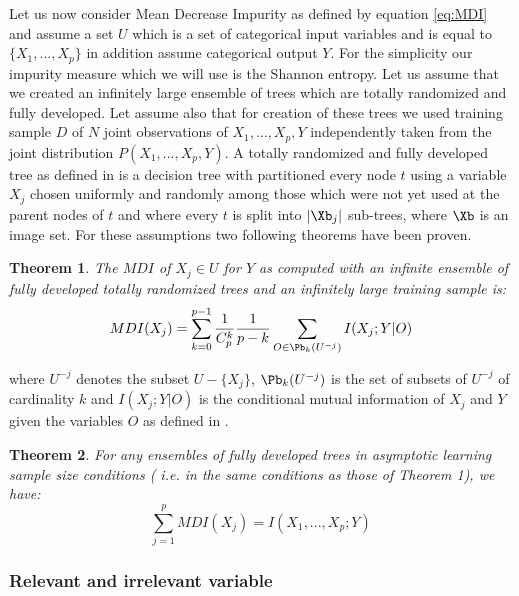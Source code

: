 Let us now consider Mean Decrease Impurity as defined by equation \eqref{eq:MDI} and assume a set $U$ which is a set of categorical input variables and is equal to $\{X_1,...,X_p\}$ in addition assume categorical output $Y$. For the simplicity our impurity measure which we will use is the Shannon entropy. Let us assume that we created an infinitely large ensemble of trees which are totally randomized and fully developed. Let assume also that for creation of these trees we used training sample $D$ of $N$ joint observations of $X_1,...,X_p,Y$ independently taken from the joint distribution $P(X_1,...,X_p,Y)$. A totally randomized and fully developed tree as defined in \cite{louppe2013understanding} is a decision tree with partitioned every node $t$ using a variable $X_j$ chosen uniformly and randomly among those which were not yet used at the parent nodes of $t$
and where every $t$ is split into $|\Xb_j|$ sub-trees, where $\Xb$ is an image set. For these assumptions two following theorems have been proven.

\newtheorem{theorem}{Theorem}
\begin{theorem}
    The $MDI$ of $X_j \in U$ for $Y$ as computed with an infinite ensemble of fully developed totally randomized trees and an infinitely large training sample is:
    \begin{equation}
	{MDI}( X_{j} ) = \displaystyle \sum_{k=0}^{p-1}\frac{1}{C^k_p}\frac{1}{p-k} \displaystyle\sum_{O \in \Pb_{k}(U^{-j})} I(X_j;Y|O)
    \end{equation}
    
\end{theorem}
where $U^{-j}$ denotes the subset $U-\{X_j\}$, $\Pb_{k}(U^{-j})$ is the set of subsets of $U^{-j}$
of cardinality $k$ and $I(X_j;Y|O)$ is the conditional mutual information of $X_j$ and $Y$ given the variables $O$  as defined in \cite{kohavi1997importance}.

\begin{theorem}
	For any ensembles of fully developed trees in asymptotic learning sample size conditions (
	i.e. in the same conditions as those of Theorem 1), we have:
	\begin{equation}
	\displaystyle \sum_{j=1}^{p}{MDI}( X_{j} ) = I(X_1,...,X_p;Y)
     \end{equation}
	
\end{theorem}

\subsubsection{Relevant and irrelevant variable}

